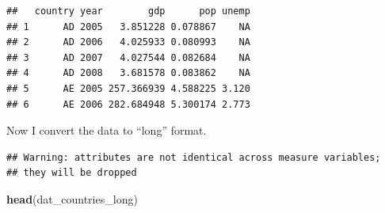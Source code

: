 \documentclass[12pt,oneside,openany]{book}
\newenvironment{Shaded}{\begin{snugshade}}{\end{snugshade}}
\newcommand{\KeywordTok}[1]{\textcolor[rgb]{0.13,0.29,0.53}{\textbf{#1}}}
\newcommand{\DataTypeTok}[1]{\textcolor[rgb]{0.13,0.29,0.53}{#1}}
\newcommand{\FloatTok}[1]{\textcolor[rgb]{0.00,0.00,0.81}{#1}}
\newcommand{\StringTok}[1]{\textcolor[rgb]{0.31,0.60,0.02}{#1}}
\newcommand{\OperatorTok}[1]{\textcolor[rgb]{0.81,0.36,0.00}{\textbf{#1}}}
\newcommand{\NormalTok}[1]{#1}
\begin{document}
\begin{Shaded}
\end{Shaded}

\begin{verbatim}
##   country year        gdp      pop unemp
## 1      AD 2005   3.851228 0.078867    NA
## 2      AD 2006   4.025933 0.080993    NA
## 3      AD 2007   4.027544 0.082684    NA
## 4      AD 2008   3.681578 0.083862    NA
## 5      AE 2005 257.366939 4.588225 3.120
## 6      AE 2006 282.684948 5.300174 2.773
\end{verbatim}

Now I convert the data to ``long'' format.

\begin{Shaded}
\end{Shaded}

\begin{verbatim}
## Warning: attributes are not identical across measure variables;
## they will be dropped
\end{verbatim}

\begin{Shaded}
\begin{Highlighting}[]
\KeywordTok{head}\NormalTok{(dat_countries_long)}
\end{Highlighting}
\end{Shaded}
\end{document}
